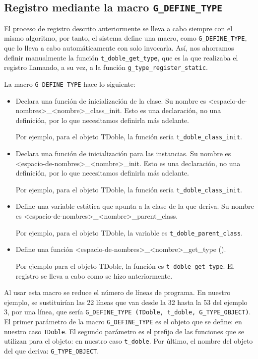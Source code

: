 \subsection{Registro mediante la macro \texttt{G\_DEFINE\_TYPE}}
El proceso de registro descrito anteriormente se lleva a cabo siempre con el mismo algoritmo, por tanto,
el sistema define una macro, como \texttt{G\_DEFINE\_TYPE},  que lo lleva a cabo automáticamente
con solo invocarla.  Así, nos ahorramos definir manualmente la función \texttt{t\_doble\_get\_type},
que es la que realizaba el registro llamando, a su vez,  a la función \texttt{g\_type\_register\_static}.

La macro \texttt{G\_DEFINE\_TYPE} hace lo siguiente:
\begin{itemize}
  \tightlist
\item Declara una función de inicialización de la clase. Su nombre es \textsf{<espacio-de-nombres>\_<nombre>\_class\_init}. Esto es una declaración, no una definición,
  por lo que necesitamos definirla más adelante.

  Por ejemplo, para el objeto \textsf{TDoble}, la función sería \texttt{t\_doble\_class\_init}.
\item Declara una función de inicialización para las instancias. Su nombre es
  \textsf{<espacio-de-nombres>\_<nombre>\_init}.
  Esto es una declaración, no una definición, por lo que necesitamos definirla más adelante.

  Por ejemplo, para el objeto \textsf{TDoble}, la función sería \texttt{t\_doble\_class\_init}.
\item Define una variable estática que apunta a la clase de la que deriva. Su nombre es
  \textsf{<espacio-de-nombres>\_<nombre>\_parent\_class}.
  
  Por ejemplo, para el objeto \textsf{TDoble}, la variable es \texttt{t\_doble\_parent\_class}.
\item Define una función \textsf{<espacio-de-nombres>\_<nombre>\_get\_type ()}.
  
  Por ejemplo para el objeto \textsf{TDoble}, la función es \texttt{t\_doble\_get\_type}.
  El registro se lleva a cabo como se hizo anteriormente.
\end{itemize}

Al usar esta macro se reduce el número de líneas de programa. En nuestro ejemplo, se sustituirían
las 22 líneas que van desde la 32 hasta la 53 del ejemplo 3, por una línea, que sería
\texttt{G\_DEFINE\_TYPE (TDoble, t\_doble, G\_TYPE\_OBJECT)}.
El primer parámetro de la macro \texttt{G\_DEFINE\_TYPE} es el objeto que se define: en nuestro
caso \texttt{TDoble}. El segundo parámetro es el prefijo de las funciones que se utilizan para el
objeto: en nuestro caso \texttt{t\_doble}. Por último, el nombre del objeto del que deriva:
\texttt{G\_TYPE\_OBJECT}.

